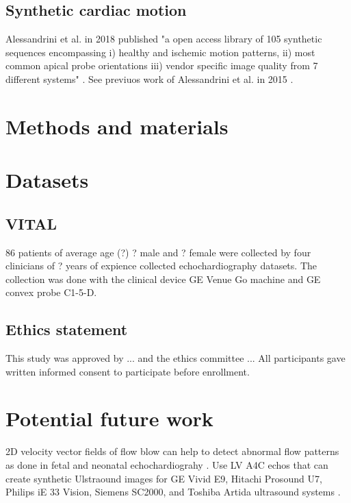 \subsection{Synthetic cardiac motion}
Alessandrini et al. in 2018 published "a open access library of 105 synthetic sequences encompassing i) healthy and ischemic motion patterns, ii) most common apical probe orientations iii) vendor specific image quality from 7 different systems" \cite{alessandrini2018}.
See previuos work of Alessandrini et al. in 2015  \cite{alessandrini2015_isbi}.

\section{Methods and materials}

\section{Datasets}

\subsection{VITAL}
86 patients of average age (?) ? male and ? female were collected by four clinicians of ? years of expience collected echochardiography datasets.
The collection was done with the clinical device GE Venue Go machine and GE convex probe C1-5-D.

\subsection{Ethics statement}
This study was approved by ... and the ethics committee ...
All participants gave written informed consent to participate before enrollment.

\section{Potential future work}
2D velocity vector fields of flow blow can help to detect abnormal flow patterns as done in fetal and neonatal echochardiograhy \cite{Meyers2020}.
Use LV A4C echos that can create synthetic Ulstraound images for GE Vivid E9, Hitachi Prosound U7, Philips iE 33 Vision, Siemens SC2000, and Toshiba Artida ultrasound systems \cite{brindise2020unsupervised}. 
